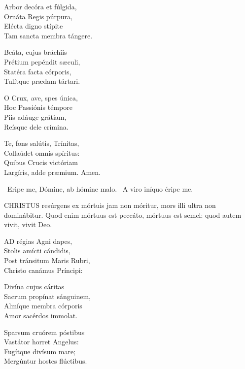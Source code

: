 Arbor decóra et fúlgida,\\
Ornáta Regis púrpura,\\
Elécta digno stípite\\
Tam sancta membra tángere.

Beáta, cujus bráchiis\\
Prétium pepéndit sæculi,\\
Statéra facta córporis,\\
Tulítque prædam tártari.

O Crux, ave, spes única,\\
Hoc Passiónis témpore\\
Piis adáuge grátiam,\\
Reísque dele crímina.

Te, fons salútis, Trínitas,\\
Collaúdet omnis spíritus:\\
Quibus Crucis victóriam\\
Largíris, adde præmium. Amen.

\V\ Eripe me, Dómine, ab hómine malo. \R\ A viro iníquo éripe me.





\lettrine[lines=2]{C}{HRISTUS} resúrgens ex mórtuis jam non móritur, mors illi ultra non dominábitur. Quod enim mórtuus est peccáto, mórtuus est semel: quod autem vivit, vivit Deo.


\lettrine[lines=2]{A}{D} régias Agni dapes,\\
Stolis amícti cándidis,\\
Post tránsitum Maris Rubri,\\
Christo canámus Príncipi:

Divína cujus cáritas\\
Sacrum propínat sánguinem,\\
Almíque membra córporis\\
Amor sacérdos immolat.

Sparsum cruórem póstibus\\
Vastátor horret Angelus:\\
Fugítque divísum mare;\\
Mergúntur hostes flúctibus.

